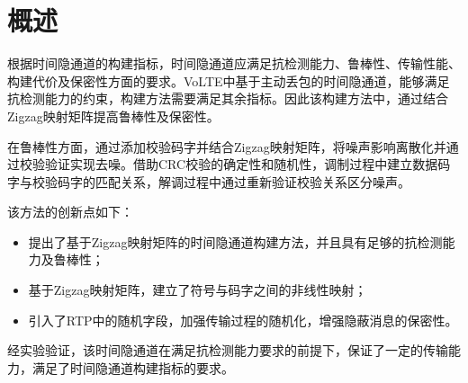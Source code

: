 \section{概述}
\label{chap:zigzag:overview}

根据时间隐通道的构建指标，时间隐通道应满足抗检测能力、鲁棒性、传输性能、构建代价及保密性方面的要求。VoLTE中基于主动丢包的时间隐通道，能够满足抗检测能力的约束，构建方法需要满足其余指标。因此该构建方法中，通过结合Zigzag映射矩阵提高鲁棒性及保密性。

在鲁棒性方面，通过添加校验码字并结合Zigzag映射矩阵，将噪声影响离散化并通过校验验证实现去噪。借助CRC校验的确定性和随机性，调制过程中建立数据码字与校验码字的匹配关系，解调过程中通过重新验证校验关系区分噪声。

该方法的创新点如下：
\begin{itemize}
	\item 提出了基于Zigzag映射矩阵的时间隐通道构建方法，并且具有足够的抗检测能力及鲁棒性；
	\item 基于Zigzag映射矩阵，建立了符号与码字之间的非线性映射；
	\item 引入了RTP中的随机字段，加强传输过程的随机化，增强隐蔽消息的保密性。
\end{itemize}

经实验验证，该时间隐通道在满足抗检测能力要求的前提下，保证了一定的传输能力，满足了时间隐通道构建指标的要求。